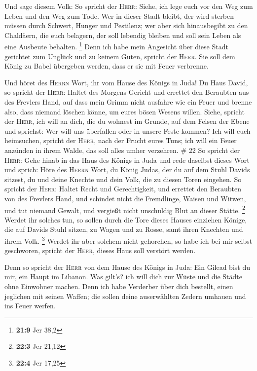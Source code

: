  Und sage diesem Volk: So spricht der \textsc{Herr}:
Siehe, ich lege euch vor den Weg zum Leben und den Weg zum Tode.
 Wer in dieser Stadt bleibt, der wird sterben müssen durch
Schwert, Hunger und Pestilenz; wer aber sich hinausbegibt zu den
Chaldäern, die euch belagern, der soll lebendig bleiben und soll sein
Leben als eine Ausbeute behalten. \footnote{\textbf{21:9} Jer 38,2}
 Denn ich habe mein Angesicht über diese Stadt gerichtet
zum Unglück und zu keinem Guten, spricht der \textsc{Herr}. Sie soll dem
König zu Babel übergeben werden, dass er sie mit Feuer verbrenne.

 Und höret des \textsc{Herrn} Wort, ihr vom Hause des
Königs in Juda!  Du Haus David, so spricht der
\textsc{Herr}: Haltet des Morgens Gericht und errettet den Beraubten aus
des Frevlers Hand, auf dass mein Grimm nicht ausfahre wie ein Feuer und
brenne also, dass niemand löschen könne, um eures bösen Wesens willen.
 Siehe, spricht der \textsc{Herr}, ich will an dich, die
du wohnest im Grunde, auf dem Felsen der Ebene und sprichst: Wer will
uns überfallen oder in unsere Feste kommen?  Ich will
euch heimsuchen, spricht der \textsc{Herr}, nach der Frucht eures Tuns;
ich will ein Feuer anzünden in ihrem Walde, das soll alles umher
verzehren. \# 22  So spricht der \textsc{Herr}: Gehe hinab
in das Haus des Königs in Juda und rede daselbst dieses Wort
 und sprich: Höre des \textsc{Herrn} Wort, du König Judas,
der du auf dem Stuhl Davids sitzest, du und deine Knechte und dein Volk,
die zu diesen Toren eingehen.  So spricht der
\textsc{Herr}: Haltet Recht und Gerechtigkeit, und errettet den
Beraubten von des Frevlers Hand, und schindet nicht die Fremdlinge,
Waisen und Witwen, und tut niemand Gewalt, und vergießt nicht unschuldig
Blut an dieser Stätte. \footnote{\textbf{22:3} Jer 21,12} 
Werdet ihr solches tun, so sollen durch die Tore dieses Hauses einziehen
Könige, die auf Davids Stuhl sitzen, zu Wagen und zu Rosse, samt ihren
Knechten und ihrem Volk. \footnote{\textbf{22:4} Jer 17,25}
 Werdet ihr aber solchem nicht gehorchen, so habe ich bei
mir selbst geschworen, spricht der \textsc{Herr}, dieses Haus soll
verstört werden.

 Denn so spricht der \textsc{Herr} von dem Hause des
Königs in Juda: Ein Gilead bist du mir, ein Haupt im Libanon. Was
gilt's? ich will dich zur Wüste und die Städte ohne Einwohner machen.
 Denn ich habe Verderber über dich bestellt, einen
jeglichen mit seinen Waffen; die sollen deine auserwählten Zedern
umhauen und ins Feuer werfen.

